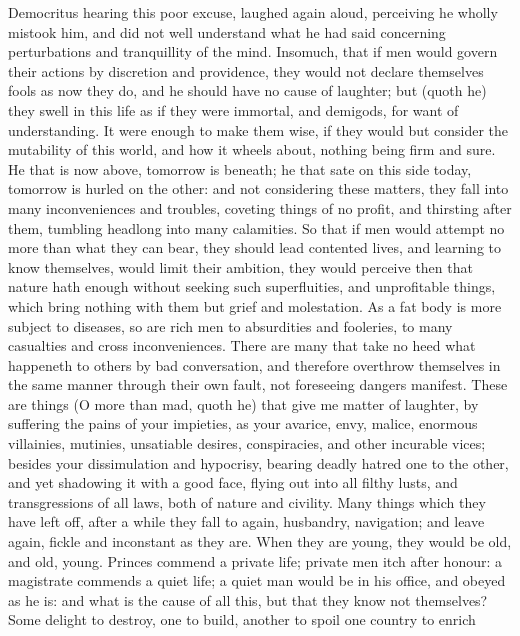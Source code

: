 Democritus hearing this poor excuse, laughed again aloud, perceiving he wholly
mistook him, and did not well understand what he had said concerning
perturbations and tranquillity of the mind. Insomuch, that if men would govern
their actions by discretion and providence, they would not declare themselves
fools as now they do, and he should have no cause of laughter; but (quoth he)
they swell in this life as if they were immortal, and demigods, for want of
understanding. It were enough to make them wise, if they would but consider the
mutability of this world, and how it wheels about, nothing being firm and sure.
He that is now above, tomorrow is beneath; he that sate on this side today,
tomorrow is hurled on the other: and not considering these matters, they fall
into many inconveniences and troubles, coveting things of no profit, and
thirsting after them, tumbling headlong into many calamities. So that if men
would attempt no more than what they can bear, they should lead contented
lives, and learning to know themselves, would limit their ambition,
they would perceive then that nature hath enough without
seeking such superfluities, and unprofitable things, which bring nothing with
them but grief and molestation. As a fat body is more subject to diseases, so
are rich men to absurdities and fooleries, to many casualties and cross
inconveniences. There are many that take no heed what happeneth to others by
bad conversation, and therefore overthrow themselves in the same manner through
their own fault, not foreseeing dangers manifest. These are things (O more than
mad, quoth he) that give me matter of laughter, by suffering the pains of your
impieties, as your avarice, envy, malice, enormous villainies, mutinies,
unsatiable desires, conspiracies, and other incurable vices; besides your
dissimulation and hypocrisy, bearing deadly hatred one to
the other, and yet shadowing it with a good face, flying out into all filthy
lusts, and transgressions of all laws, both of nature and civility. Many things
which they have left off, after a while they fall to again, husbandry,
navigation; and leave again, fickle and inconstant as they are. When they are
young, they would be old, and old, young. Princes commend a
private life; private men itch after honour: a magistrate commends a quiet
life; a quiet man would be in his office, and obeyed as he is: and what is the
cause of all this, but that they know not themselves? Some delight to destroy,
one to build, another to spoil one country to enrich
